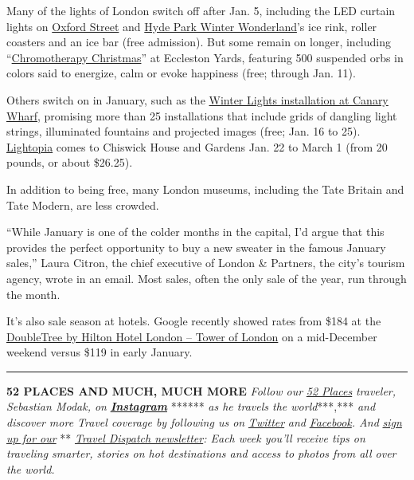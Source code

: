 Many of the lights of London switch off after Jan. 5, including the LED
curtain lights on \href{https://www.oxfordstreet.co.uk/}{Oxford Street}
and \href{https://hydeparkwinterwonderland.com/}{Hyde Park Winter
Wonderland}'s ice rink, roller coasters and an ice bar (free admission).
But some remain on longer, including
``\href{http://mayfairandbelgravia.com/eccleston-yards/news-and-events/chromotherapy-christmas}{Chromotherapy
Christmas}'' at Eccleston Yards, featuring 500 suspended orbs in colors
said to energize, calm or evoke happiness (free; through Jan. 11).

Others switch on in January, such as the
\href{https://canarywharf.com/arts-events/events/winter-lights-jan-2020/?instance_id=}{Winter
Lights installation at Canary Wharf}, promising more than 25
installations that include grids of dangling light strings, illuminated
fountains and projected images (free; Jan. 16 to 25).
\href{http://chiswickhouseandgardens.org.uk/event/lightopia/}{Lightopia}
comes to Chiswick House and Gardens Jan. 22 to March 1 (from 20 pounds,
or about \$26.25).

In addition to being free, many London museums, including the Tate
Britain and Tate Modern, are less crowded.

``While January is one of the colder months in the capital, I'd argue
that this provides the perfect opportunity to buy a new sweater in the
famous January sales,'' Laura Citron, the chief executive of London \&
Partners, the city's tourism agency, wrote in an email. Most sales,
often the only sale of the year, run through the month.

It's also sale season at hotels. Google recently showed rates from \$184
at the
\href{https://doubletree3.hilton.com/en/hotels/united-kingdom/doubletree-by-hilton-hotel-london-tower-of-london-LONTLDI/index.html}{DoubleTree
by Hilton Hotel London -- Tower of London} on a mid-December weekend
versus \$119 in early January.

\begin{center}\rule{0.5\linewidth}{\linethickness}\end{center}

\textbf{52 PLACES AND MUCH, MUCH MORE} \emph{Follow our}
\href{https://www.nytimes3xbfgragh.onion/interactive/2019/travel/places-to-visit.html?action=click\&module=inline\&pgtype=Article}{\emph{52
Places}} \emph{traveler, Sebastian Modak, on}
\textbf{\href{https://www.instagram.com/nytimestravel/}{\emph{Instagram}}}
****** \emph{as he travels the world}***,*** \emph{and discover more
Travel coverage by following us on}
\href{https://twitter.com/nytimestravel}{\emph{Twitter}} \emph{and}
\href{https://www.facebookcorewwwi.onion/nytimestravel/}{\emph{Facebook}}\emph{.
And}
\href{https://www.nytimes3xbfgragh.onion/newsletters/traveldispatch?action=click\&module=inline\&pgtype=Article}{\emph{sign
up for our}} **
\href{https://www.nytimes3xbfgragh.onion/newsletters/traveldispatch?module=inline}{\emph{Travel
Dispatch newsletter}}\emph{: Each week you'll receive tips on traveling
smarter, stories on hot destinations and access to photos from all over
the world.}

